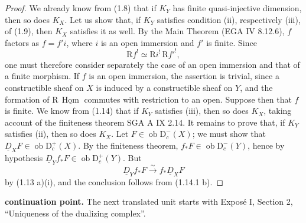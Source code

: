 \documentclass[11pt,a4paper]{article}
\newcommand{\D}{\mathrm{D}}
\newcommand{\ob}{\operatorname{ob}}
\DeclareMathOperator{\Hom}{Hom}
\newcommand{\RHom}{\mathrm{R}\,\underline{\Hom}}
\newcommand{\Ddual}{\underline{D}}
\theoremstyle{plain}
\theoremstyle{definition}
\begin{document}
\begin{proof}
We already know from (1.8) that if $K_Y$ has finite quasi-injective dimension, then so does $K_X$. Let us show that, if $K_Y$ satisfies condition (ii), respectively (iii), of (1.9), then $K_X$ satisfies it as well. By the Main Theorem (EGA IV 8.12.6), $f$ factors as $f=f'i$, where $i$ is an open immersion and $f'$ is finite. Since
\[
\mathrm Rf^!\simeq \mathrm Ri^!\,\mathrm Rf'^!,
\]
one must therefore consider separately the case of an open immersion and that of a finite morphism. If $f$ is an open immersion, the assertion is trivial, since a constructible sheaf on $X$ is induced by a constructible sheaf on $Y$, and the formation of $\RHom$ commutes with restriction to an open. Suppose then that $f$ is finite. We know from (1.14) that if $K_Y$ satisfies (iii), then so does $K_X$, taking account of the finiteness theorem SGA A IX 2.14. It remains to prove that, if $K_Y$ satisfies (ii), then so does $K_X$. Let $F\in\ob\D_c^-(X)$; we must show that $\Ddual_XF\in\ob\D_c^+(X)$. By the finiteness theorem, $f_*F\in\ob\D_c^-(Y)$, hence by hypothesis $\Ddual_Yf_*F\in\ob\D_c^+(Y)$. But
\[
\Ddual_Yf_*F\xrightarrow{\sim}f_*\Ddual_XF
\]
by (1.13 a)(i), and the conclusion follows from (1.14.1 b).
\end{proof}

\bigskip
\noindent\textbf{continuation point.} The next translated unit starts with Exposé I, Section 2, ``Uniqueness of the dualizing complex''.
\end{document}
